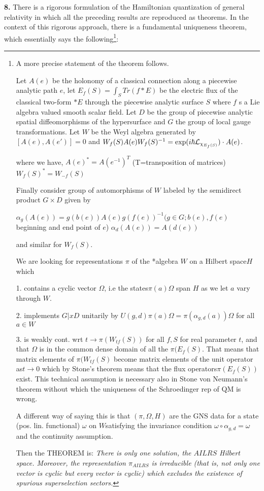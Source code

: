 \documentclass[12pt]{article}
\begin{document}
  {\bf 8.}  There is a rigorous formulation of the Hamiltonian 
  quantization of general relativity in which all the preceding 
  results are reproduced as theorems\cite{gangof5,thomas,thomas-thesis}. 
In the context of this rigorous approach, there is a fundamental uniqueness
theorem\cite{unique}, which essentially says the following\footnote{A more
precise statement of the theorem follows\cite{thomas-personal}.

Let $A(e)$ be the holonomy of a classical connection along a piecewise
analytic path $e$, let $E_f(S)=\int_S Tr(f *E)$ be the electric flux of
the classical two-form $*E$ through the piecewise analytic surface $S$ where
$f $ s a Lie algebra valued smooth scalar field. Let $D$ be the group of
piecewise analytic spatial diffeomorphisms of the hypersurface and
$G$ the group of local gauge transformations. Let
$W$ be the Weyl algebra generated by
$[A(e),A(e')]=0$ and
$W_f(S) A(e) W_f(S)^{-1}=\exp(i\hbar {\cal L}_{\chi_{E_f(S)}})\cdot A(e)$. 

where we have, 
$A(e)^*=A(e^{-1})^T  $ (T=transposition of matrices)
$W_f(S)^*=W_{-f}(S)$

Finally consider group of automorphisms of $W$ labeled by the semidirect
product $G \times D$ given by

$\alpha_g(A(e))=g(b(e)) A(e) g(f(e))^{-1} (g\in G; b(e),f(e)$  beginning and
                                          end point of $e$)
$\alpha_d(A(e))=A(d(e))$

and similar for $W_f(S).$

We are looking for representations $\pi$ of the *algebra $W$ on a Hilbert
space$ H$ which

1. contains a cyclic vector $ \Omega$, i.e the states$ \pi(a)\Omega$ span $H$
as we let $a$ vary through $W.$

2. implements $G |x D$ unitarily by
$U(g,d)\pi(a)\Omega=\pi(\alpha_{g,d}(a))\Omega$  for all $a \in W$

3. is weakly cont. wrt $t \to \pi(W_{tf}(S))$ for all $f, S$ for real parameter
$t$, and that  $\Omega$ is in the common dense domain of all the $\pi(E_f(S)$. 
That means that matrix elements of $\pi(W_{tf}(S)$ become matrix
elements of the unit operator as$ t \to 0$ which by Stone's theorem means
that the flux operators$ \pi(E_f(S))$ exist. This technical assumption
is necessary also in Stone von Neumann's theorem without which the
uniqueness of the Schroedinger rep of QM is wrong.

A different way of saying this is that $(\pi,\Omega,H)$ are the GNS data
for a state (pos. lin. functional) $\omega$ on $W $satisfying the invariance
condition $\omega\circ \alpha_{g,d} =\omega$ and the continuity assumption.

Then the THEOREM is:
{\it There is only one solution, the $AILRS$ Hilbert space.
Moreover, the representation $\pi_{AILRS}$ is irreducible (that is, not only
one vector is cyclic but every vector is cyclic) which excludes the
existence of spurious superselection sectors.} }: 
\end{document}

